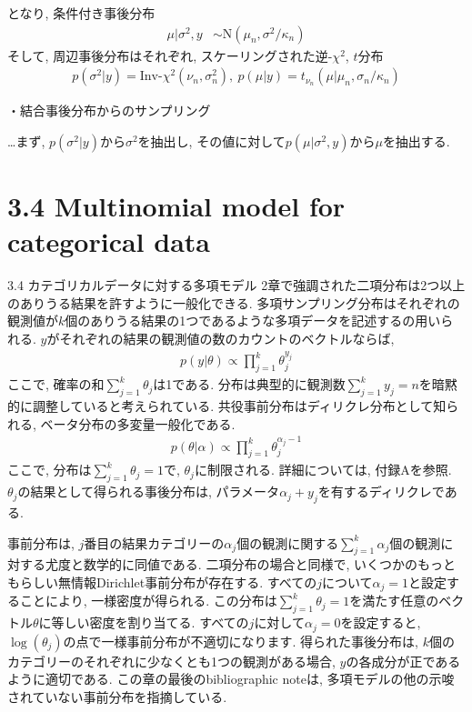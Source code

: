 \documentclass[10pt,dvipdfmx,a4]{beamer}
\newcommand{\eqn}[1]{\begin{align*}#1\end{align*}}
\begin{document}
\begin{frame}
となり, 条件付き事後分布
\eqn{\mu|\sigma^2,y&\sim\text{N}(\mu_n,\sigma^2/\kappa_n)}
そして, 周辺事後分布はそれぞれ, スケーリングされた逆-$\chi^2$, $t$分布
\eqn{p(\sigma^2|y)=\text{Inv-}\chi^2(\nu_n,\sigma_n^2),\ p(\mu|y)=t_{\nu_n}(\mu|\mu_n,\sigma_n/\kappa_n)}

・結合事後分布からのサンプリング

…まず, $p(\sigma^2|y)$から$\sigma^2$を抽出し, その値に対して$p(\mu|\sigma^2,y)$から$\mu$を抽出する.
\end{frame}

\section{3.4 Multinomial model for categorical data}
\begin{frame}{3.4 カテゴリカルデータに対する多項モデル}
2章で強調された二項分布は2つ以上のありうる結果を許すように一般化できる.
多項サンプリング分布はそれぞれの観測値が$k$個のありうる結果の1つであるような多項データを記述するの用いられる.
$y$がそれぞれの結果の観測値の数のカウントのベクトルならば,
\eqn{p(y|\theta)\propto\prod_{j=1}^k \theta_j^{y_j}}
ここで, 確率の和$\sum_{j=1}^k\theta_j$は1である.
分布は典型的に観測数$\sum_{j=1}^k y_j=n$を暗黙的に調整していると考えられている.
共役事前分布はディリクレ分布として知られる, ベータ分布の多変量一般化である.
\eqn{p(\theta|\alpha)\propto \prod_{j=1}^k\theta_j^{\alpha_j-1}}
ここで, 分布は$\sum_{j=1}^k \theta_j=1$で, $\theta_j$に制限される.
詳細については, 付録Aを参照.
$\theta_j$の結果として得られる事後分布は, パラメータ$\alpha_j+y_j$を有するディリクレである.
\end{frame}


\begin{frame}
事前分布は, $j$番目の結果カテゴリーの$\alpha_j$個の観測に関する$\sum_{j=1}^k \alpha_j$個の観測に対する尤度と数学的に同値である.
二項分布の場合と同様で, いくつかのもっともらしい無情報Dirichlet事前分布が存在する.
すべての$j$について$\alpha_j= 1$と設定することにより, 一様密度が得られる.
この分布は$\sum^k_{j=1}\theta_j=1$を満たす任意のベクトル$\theta$に等しい密度を割り当てる.
すべての$j$に対して$\alpha_j= 0$を設定すると, $\log(\theta_j)$の点で一様事前分布が不適切になります.
得られた事後分布は, $k$個のカテゴリーのそれぞれに少なくとも1つの観測がある場合, $y$の各成分が正であるように適切である.
この章の最後のbibliographic noteは, 多項モデルの他の示唆されていない事前分布を指摘している.
\end{frame}
\end{document}
